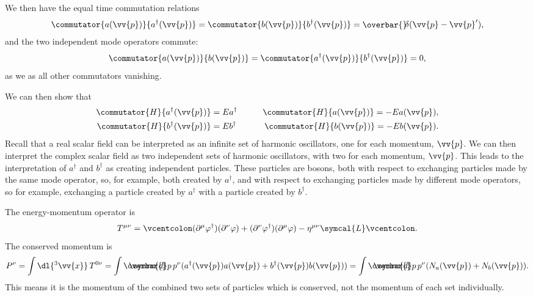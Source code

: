 \documentclass[fleqn]{NotesClass}
\newcommand{\minkowskiMetric}{\eta}
\newcommand{\lagrangianDensity}{\symcal{L}}
\newcommand{\hermit}{{\dagger}}
\newcommand{\dbar}[1][0.0]{\ThisStyle{\ensurestackMath{%
            \stackengine{#1\LMex}{\SavedStyle \symrm{d}}{\SavedStyle\overbar{}%
                \mkern2.25mu}{O}{r}{F}{F}{L}}}}
\newcommand{\invariantmeasure}[1]{%
    \mathchoice{\dbar #1}{\dbar #1}{\dbar[.05] #1}{\dbar[.06] #1}
}
\newcommand\bardelta{\ThisStyle{\ensurestackMath{%
            \stackengine{-.3\LMpt}{\SavedStyle \delta}{\SavedStyle\overbar{}%
                \mkern4.5mu}{O}{r}{F}{F}{L}}}}
\newcommand{\normalordering}[1]{\mathopen{\vcentcolon}{#1}\mathclose{\vcentcolon}}
\begin{document}
    We then have the equal time commutation relations
    \begin{equation}
        \commutator{a(\vv{p})}{a^\hermit(\vv{p})} = \commutator{b(\vv{p})}{b^\hermit(\vv{p})} = \bardelta(\vv{p} - \vv{p}'),
    \end{equation}
    and the two independent mode operators commute:
    \begin{equation}
        \commutator{a(\vv{p})}{b(\vv{p})} = \commutator{a^\hermit(\vv{p})}{b^\hermit(\vv{p})} = 0,
    \end{equation}
    as we as all other commutators vanishing.
    
    We can then show that
    \begin{alignat}{2}
        \commutator{H}{a^\hermit(\vv{p})} &= Ea^\hermit \qquad & \commutator{H}{a(\vv{p})} = -Ea(\vv{p}),\\
        \commutator{H}{b^\hermit(\vv{p})} &= Eb^\hermit \qquad & \commutator{H}{b(\vv{p})} = -Eb(\vv{p}).
    \end{alignat}
    Recall that a real scalar field can be interpreted as an infinite set of harmonic oscillators, one for each momentum, \(\vv{p}\).
    We can then interpret the complex  scalar field as two independent sets of harmonic oscillators, with two for each momentum, \(\vv{p}\).
    This leads to the interpretation of \(a^\hermit\) and \(b^\hermit\) as creating independent particles.
    These particles are bosons, both with respect to exchanging particles made by the same mode operator, so, for example, both created by \(a^\hermit\), and with respect to exchanging particles made by different mode operators, so for example, exchanging a particle created by \(a^\hermit\) with a particle created by \(b^\hermit\).
    
    The energy-momentum operator is
    \begin{equation}
        T^{\mu\nu} = \normalordering{(\partial^\mu\varphi^\hermit)(\partial^\nu \varphi) + (\partial^\nu \varphi^\hermit) (\partial^\mu \varphi) - \minkowskiMetric^{\mu\nu}\lagrangianDensity}.
    \end{equation}
    The conserved momentum is
    \begin{equation*}
        P^\nu = \int \dl{^3\vv{x}} \, T^{0\nu} = \int \invariantmeasure{p} \, p^\nu(a^\hermit(\vv{p})a(\vv{p}) + b^\hermit(\vv{p})b(\vv{p})) = \int \invariantmeasure{p} \, p^\nu (N_a(\vv{p}) + N_b(\vv{p})).
    \end{equation*}
    This means it is the momentum of the combined two sets of particles which is conserved, not the momentum of each set individually.
    
\end{document}
